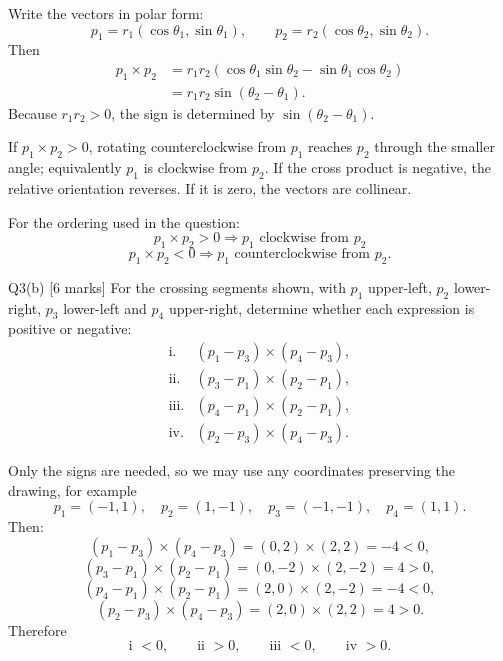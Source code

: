 \documentclass[10.5pt,a4paper]{article}
\begin{document}
\begin{answerbox}
Write the vectors in polar form:
\[
p_1=r_1(\cos\theta_1,\sin\theta_1),
\qquad
p_2=r_2(\cos\theta_2,\sin\theta_2).
\]
Then
\[
\begin{aligned}
p_1\times p_2
&=r_1r_2(\cos\theta_1\sin\theta_2-\sin\theta_1\cos\theta_2)\\
&=r_1r_2\sin(\theta_2-\theta_1).
\end{aligned}
\]
Because $r_1r_2>0$, the sign is determined by $\sin(\theta_2-\theta_1)$.

If $p_1\times p_2>0$, rotating counterclockwise from $p_1$ reaches $p_2$ through the smaller angle; equivalently $p_1$ is clockwise from $p_2$. If the cross product is negative, the relative orientation reverses. If it is zero, the vectors are collinear.

\begin{keybox}
For the ordering used in the question:
\[
\boxed{p_1\times p_2>0\Rightarrow p_1\text{ clockwise from }p_2}
\]
\[
\boxed{p_1\times p_2<0\Rightarrow p_1\text{ counterclockwise from }p_2.}
\]
\end{keybox}
\end{answerbox}

\begin{questionbox}{Q3(b) [6 marks]}
For the crossing segments shown, with $p_1$ upper-left, $p_2$ lower-right, $p_3$ lower-left and $p_4$ upper-right, determine whether each expression is positive or negative:
\[
\begin{array}{ll}
\text{i.}&(p_1-p_3)\times(p_4-p_3),\\
\text{ii.}&(p_3-p_1)\times(p_2-p_1),\\
\text{iii.}&(p_4-p_1)\times(p_2-p_1),\\
\text{iv.}&(p_2-p_3)\times(p_4-p_3).
\end{array}
\]
\end{questionbox}

\begin{answerbox}
Only the signs are needed, so we may use any coordinates preserving the drawing, for example
\[
p_1=(-1,1),\quad p_2=(1,-1),\quad p_3=(-1,-1),\quad p_4=(1,1).
\]
Then:
\[
(p_1-p_3)\times(p_4-p_3)
=(0,2)\times(2,2)=-4<0,
\]
\[
(p_3-p_1)\times(p_2-p_1)
=(0,-2)\times(2,-2)=4>0,
\]
\[
(p_4-p_1)\times(p_2-p_1)
=(2,0)\times(2,-2)=-4<0,
\]
\[
(p_2-p_3)\times(p_4-p_3)
=(2,0)\times(2,2)=4>0.
\]
Therefore
\[
\boxed{\text{i }<0,\qquad \text{ii }>0,\qquad \text{iii }<0,\qquad \text{iv }>0.}
\]
\end{answerbox}
\end{document}
